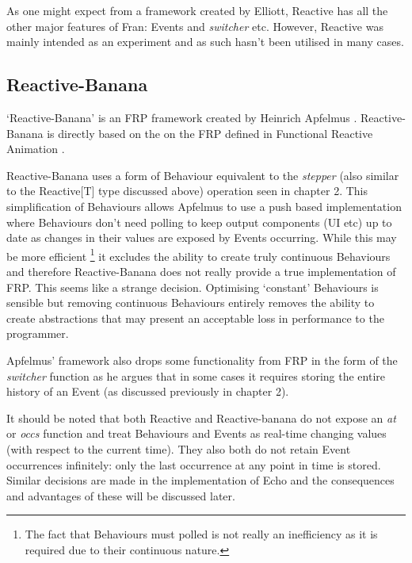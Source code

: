       As one might expect from a framework created by Elliott, Reactive has all the other major features
      of Fran: Events and \emph{switcher} etc. However, Reactive was mainly intended as an experiment
      and as such hasn't been utilised in many cases.
  
    \subsection{Reactive-Banana}
      `Reactive-Banana' is an FRP framework created by Heinrich Apfelmus \cite{Apfelmus}. Reactive-Banana
      is directly based on the on the FRP defined in Functional Reactive Animation \cite{Elliott1997}. 
      
      Reactive-Banana uses a form of Behaviour equivalent to the \emph{stepper}
      (also similar to the Reactive[T] type discussed above) operation seen in chapter 2. This simplification of Behaviours 
      allows 
      Apfelmus to use a push
      based implementation where Behaviours don't need polling to keep output components (UI etc) up to date as changes in 
      their values are exposed
      by Events occurring. While this may be more efficient \footnote{The fact that Behaviours must polled is not really an 
      inefficiency as it is required due to their continuous nature. } it excludes the ability to create truly 
      continuous Behaviours and therefore Reactive-Banana does not really provide a true implementation
      of FRP. This seems like a strange decision. Optimising `constant' Behaviours is sensible
      but removing continuous Behaviours entirely removes the ability to create abstractions that may present
      an acceptable loss in performance to the programmer.
      
      Apfelmus' framework also drops some functionality from FRP in the form of the \emph{switcher} function as
      he argues that in some cases it requires storing the entire history of an Event \cite{Apfelmus2011} (as discussed 
      previously
      in chapter 2).
      
    It should be noted that both Reactive and Reactive-banana do not expose an \emph{at} or \emph{occs} function
    and treat Behaviours and Events as real-time changing values (with respect to the current time). They also both do not 
    retain Event 
    occurrences infinitely: only the last occurrence at any point in time is stored. Similar decisions are made in the 
    implementation of Echo and the consequences and advantages of these will be discussed later.

